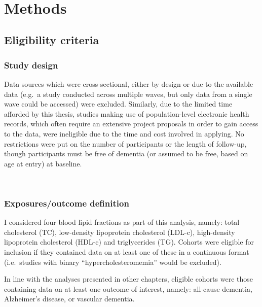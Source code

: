 \documentclass[a4paper, twoside]{templates/ociamthesis}
\begin{document}
~

\hypertarget{methods-2}{%
\section{Methods}\label{methods-2}}

\hypertarget{eligibility-criteria-1}{%
\subsection{Eligibility criteria}\label{eligibility-criteria-1}}

\hypertarget{study-design}{%
\subsubsection{Study design}\label{study-design}}

Data sources which were cross-sectional, either by design or due to the available data (e.g.~a study conducted across multiple waves, but only data from a single wave could be accessed) were excluded. Similarly, due to the limited time afforded by this thesis, studies making use of population-level electronic health records, which often require an extensive project proposals in order to gain access to the data, were ineligible due to the time and cost involved in applying. No restrictions were put on the number of participants or the length of follow-up, though participants must be free of dementia (or assumed to be free, based on age at entry) at baseline.

~

\hypertarget{exposuresoutcome-definition}{%
\subsubsection{Exposures/outcome definition}\label{exposuresoutcome-definition}}

I considered four blood lipid fractions as part of this analysis, namely: total cholesterol (TC), low-density lipoprotein cholesterol (LDL-c), high-density lipoprotein cholesterol (HDL-c) and triglycerides (TG). Cohorts were eligible for inclusion if they contained data on at least one of these in a continuous format (i.e.~studies with binary ``hypercholesteromemia'' would be excluded).

In line with the analyses presented in other chapters, eligible cohorts were those containing data on at least one outcome of interest, namely: all-cause dementia, Alzheimer's disease, or vascular dementia.
\end{document}
